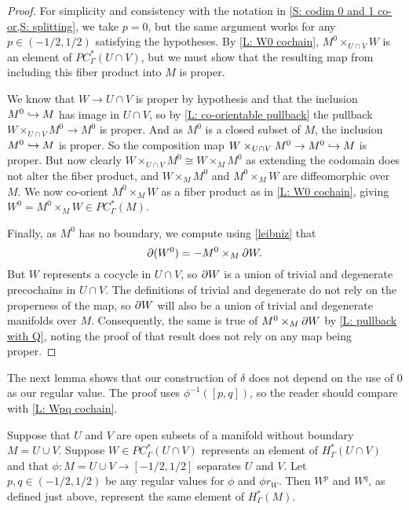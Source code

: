\begin{proof}
	For simplicity and consistency with the notation in \cref{S: codim 0 and 1 co-or,S: splitting}, we take $p = 0$, but the same argument works for any $p \in (-1/2, 1/2)$ satisfying the hypotheses.
	By \cref{L: W0 cochain}, $M^0 \times_{U\cap V} W$ is an element of $PC^*_\Gamma(U \cap V)$, but we must show that the resulting map from including this fiber product into $M$ is proper.

	We know that $W \to U \cap V$ is proper by hypothesis and that the inclusion $M^0 \hookrightarrow M$ has image in $U \cap V$, so by \cref{L: co-orientable pullback} the pullback $W \times_{U \cap V} M^0 \to M^0$ is proper.
	And as $M^0$ is a closed subset of $M$, the inclusion $M^0 \hookrightarrow M$ is proper.
	So the composition map $W \times_{U \cap V} M^0 \to M^0 \hookrightarrow M$ is proper.
	But now clearly $W \times_{U \cap V} M^0 \cong W \times_M M^0$ as extending the codomain does not alter the fiber product, and $W \times_M M^0$ and $M^0 \times_M W$ are diffeomorphic over $M$.
	We now co-orient $M^0 \times_M W$ as a fiber product as in \cref{L: W0 cochain}, giving $W^0 = M^0 \times_M W \in PC^*_\Gamma(M)$.

	Finally, as $M^0$ has no boundary, we compute using \cref{leibniz} that
	$$\partial (W^0) = - M^0 \times_{M} \partial W.$$
	But $W$ represents a cocycle in $U \cap V$, so $\partial W$ is a union of trivial and degenerate precochains in $U \cap V$.
	The definitions of trivial and degenerate do not rely on the properness of the map, so $\partial W$ will also be a union of trivial and degenerate manifolds over $M$.
	Consequently, the same is true of $M^0 \times_{M} \partial W$ by \cref{L: pullback with Q}, noting the proof of that result does not rely on any map being proper.
\end{proof}

The next lemma shows that our construction of $\delta$ does not depend on the use of $0$ as our regular value.
The proof uses $\phi^{-1}([p,q])$, so the reader should compare with \cref{L: Wpq cochain}.

\begin{lemma}\label{L: different point}
	Suppose that $U$ and $V$ are open subsets of a manifold without boundary $M = U \cup V$.
	Suppose $W \in PC^*_\Gamma(U \cap V)$ represents an element of $H^*_\Gamma(U \cap V)$ and that $\phi \colon M = U \cup V \to [-1/2,1/2]$ separates $U$ and $V$.
	Let $p, q\in (-1/2,1/2)$ be any regular values for $\phi$ and $\phi r_W$.
	Then $W^p$ and $W^q$, as defined just above, represent the same element of $H^*_\Gamma(M)$.
\end{lemma}

